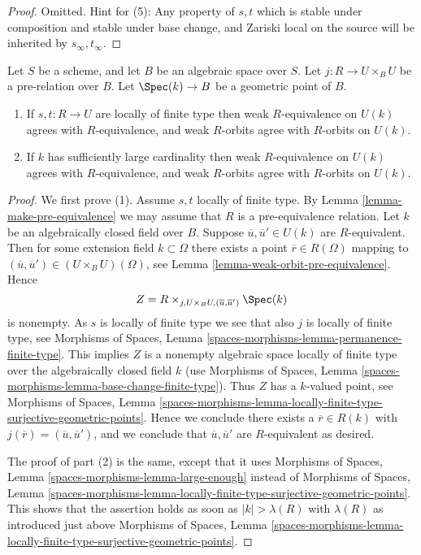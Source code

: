\begin{proof}
Omitted. Hint for (5): Any property of $s, t$ which is stable under composition
and stable under base change, and Zariski local on the source
will be inherited by $s_\infty, t_\infty$.
\end{proof}

\begin{lemma}
\label{lemma-geometric-orbits}
Let $S$ be a scheme, and let $B$ be an algebraic space over $S$.
Let $j : R \to U \times_B U$ be a pre-relation over $B$.
Let $\Spec(k) \to B$ be a geometric point of $B$.
\begin{enumerate}
\item If $s, t : R \to U$ are locally of finite type
then weak $R$-equivalence on $U(k)$ agrees with $R$-equivalence, and
weak $R$-orbits agree with $R$-orbits on $U(k)$.
\item If $k$ has sufficiently large cardinality then weak $R$-equivalence
on $U(k)$ agrees with $R$-equivalence, and weak $R$-orbits agree
with $R$-orbits on $U(k)$.
\end{enumerate}
\end{lemma}

\begin{proof}
We first prove (1). Assume $s, t$ locally of finite type. By
Lemma \ref{lemma-make-pre-equivalence}
we may assume that $R$ is a pre-equivalence relation.
Let $k$ be an algebraically closed field over $B$.
Suppose $\overline{u}, \overline{u}' \in U(k)$ are $R$-equivalent.
Then for some extension field $k \subset \Omega$ there exists
a point $\overline{r} \in R(\Omega)$ mapping to
$(\overline{u}, \overline{u}') \in (U \times_B U)(\Omega)$, see
Lemma \ref{lemma-weak-orbit-pre-equivalence}.
Hence
$$
Z = R \times_{j, U \times_B U, (\overline{u}, \overline{u}')} \Spec(k)
$$
is nonempty. As $s$ is locally of finite type we see that
also $j$ is locally of finite type, see
Morphisms of Spaces, Lemma \ref{spaces-morphisms-lemma-permanence-finite-type}.
This implies $Z$ is a nonempty algebraic space locally of finite type
over the algebraically closed field $k$ (use
Morphisms of Spaces,
Lemma \ref{spaces-morphisms-lemma-base-change-finite-type}).
Thus $Z$ has a $k$-valued point, see
Morphisms of Spaces, Lemma
\ref{spaces-morphisms-lemma-locally-finite-type-surjective-geometric-points}.
Hence we conclude there exists a $\overline{r} \in R(k)$ with
$j(\overline{r}) = (\overline{u}, \overline{u}')$, and we conclude that
$\overline{u}, \overline{u}'$ are $R$-equivalent as desired.

\medskip\noindent
The proof of part (2) is the same, except that it uses
Morphisms of Spaces, Lemma
\ref{spaces-morphisms-lemma-large-enough}
instead of
Morphisms of Spaces, Lemma
\ref{spaces-morphisms-lemma-locally-finite-type-surjective-geometric-points}.
This shows that the assertion holds as soon as $|k| > \lambda(R)$ with
$\lambda(R)$ as introduced just above
Morphisms of Spaces, Lemma
\ref{spaces-morphisms-lemma-locally-finite-type-surjective-geometric-points}.
\end{proof}

